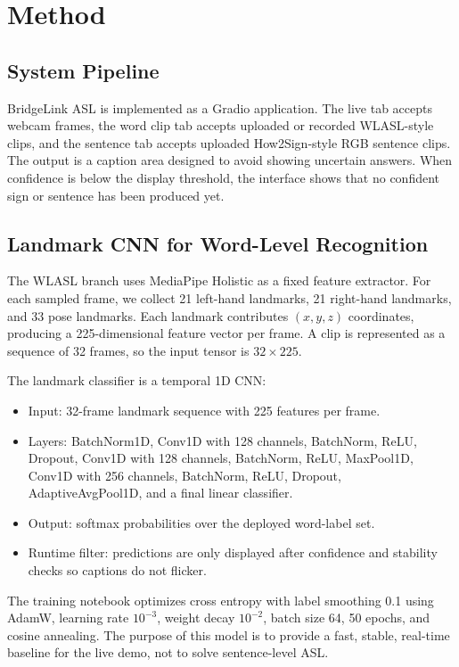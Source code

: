 \documentclass[10pt,twocolumn,letterpaper]{article}
\begin{document}
\section{Method}

\subsection{System Pipeline}

BridgeLink ASL is implemented as a Gradio application. The live tab accepts webcam frames, the word clip tab accepts uploaded or recorded WLASL-style clips, and the sentence tab accepts uploaded How2Sign-style RGB sentence clips. The output is a caption area designed to avoid showing uncertain answers. When confidence is below the display threshold, the interface shows that no confident sign or sentence has been produced yet.

\subsection{Landmark CNN for Word-Level Recognition}

The WLASL branch uses MediaPipe Holistic as a fixed feature extractor. For each sampled frame, we collect 21 left-hand landmarks, 21 right-hand landmarks, and 33 pose landmarks. Each landmark contributes $(x,y,z)$ coordinates, producing a 225-dimensional feature vector per frame. A clip is represented as a sequence of 32 frames, so the input tensor is $32 \times 225$.

The landmark classifier is a temporal 1D CNN:
\begin{itemize}
    \item Input: 32-frame landmark sequence with 225 features per frame.
    \item Layers: BatchNorm1D, Conv1D with 128 channels, BatchNorm, ReLU, Dropout, Conv1D with 128 channels, BatchNorm, ReLU, MaxPool1D, Conv1D with 256 channels, BatchNorm, ReLU, Dropout, AdaptiveAvgPool1D, and a final linear classifier.
    \item Output: softmax probabilities over the deployed word-label set.
    \item Runtime filter: predictions are only displayed after confidence and stability checks so captions do not flicker.
\end{itemize}

The training notebook optimizes cross entropy with label smoothing 0.1 using AdamW, learning rate $10^{-3}$, weight decay $10^{-2}$, batch size 64, 50 epochs, and cosine annealing. The purpose of this model is to provide a fast, stable, real-time baseline for the live demo, not to solve sentence-level ASL.
\end{document}
